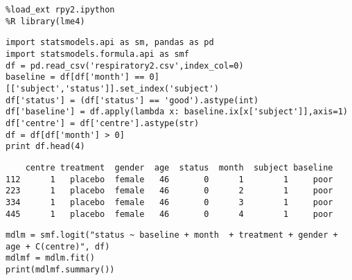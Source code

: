 \documentclass[12pt,fleqn]{article}\usepackage{../common}
\begin{document}
\begin{verbatim}
%load_ext rpy2.ipython
%R library(lme4)
\end{verbatim}

\begin{verbatim}
import statsmodels.api as sm, pandas as pd
import statsmodels.formula.api as smf
df = pd.read_csv('respiratory2.csv',index_col=0)
baseline = df[df['month'] == 0][['subject','status']].set_index('subject')
df['status'] = (df['status'] == 'good').astype(int)
df['baseline'] = df.apply(lambda x: baseline.ix[x['subject']],axis=1)
df['centre'] = df['centre'].astype(str)
df = df[df['month'] > 0]
print df.head(4)
\end{verbatim}

\begin{verbatim}
    centre treatment  gender  age  status  month  subject baseline
112      1   placebo  female   46       0      1        1     poor
223      1   placebo  female   46       0      2        1     poor
334      1   placebo  female   46       0      3        1     poor
445      1   placebo  female   46       0      4        1     poor
\end{verbatim}


\begin{verbatim}
mdlm = smf.logit("status ~ baseline + month  + treatment + gender + age + C(centre)", df)
mdlmf = mdlm.fit()
print(mdlmf.summary())
\end{verbatim}
\end{document}
